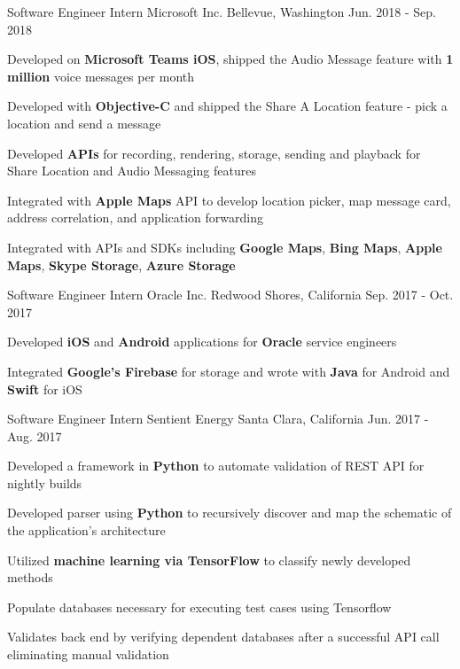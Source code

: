 \begin{cventries}
\cventry
	{Software Engineer Intern}
	{Microsoft Inc.}
	{Bellevue, Washington}
	{Jun. 2018 - Sep. 2018}
{								
	\begin{cvitems}
        \item {Developed on \textbf{Microsoft Teams iOS}, shipped the Audio Message feature with \textbf{1 million} voice messages per month}
        \item {Developed with \textbf{Objective-C} and shipped the Share A Location feature - pick a location and send a message}
        \item {Developed \textbf{APIs} for recording, rendering, storage, sending and playback for Share Location and Audio Messaging features}
        \item {Integrated with \textbf{Apple Maps} API to develop location picker, map message card, address correlation, and application forwarding}
        \item {Integrated with APIs and SDKs including \textbf{Google Maps}, \textbf{Bing Maps}, \textbf{Apple Maps}, \textbf{Skype Storage}, \textbf{Azure Storage}}
	\end{cvitems}
}

\cventry
{Software Engineer Intern}
{Oracle Inc.}
{Redwood Shores, California}
{Sep. 2017 - Oct. 2017}
{
\begin{cvitems}
\item {Developed \textbf{iOS} and \textbf{Android} applications for \textbf{Oracle} service engineers}
\item {Integrated \textbf{Google's Firebase} for storage and wrote with \textbf{Java} for Android and \textbf{Swift} for iOS}
\end{cvitems}
}

\cventry
{Software Engineer Intern} %
{Sentient Energy} %
{Santa Clara, California} %
{Jun. 2017 - Aug. 2017} %
{ %
\begin{cvitems}
\item {Developed a framework in \textbf{Python} to automate validation of REST API for nightly builds}
\item {Developed parser using \textbf{Python} to recursively discover and map the schematic of the application's architecture}
\item {Utilized \textbf{machine learning via TensorFlow} to classify newly developed methods}
\item {Populate databases necessary for executing test cases using Tensorflow} 
\item {Validates back end by verifying dependent databases after a successful API call eliminating manual validation}
\end{cvitems}
}


\end{cventries}
